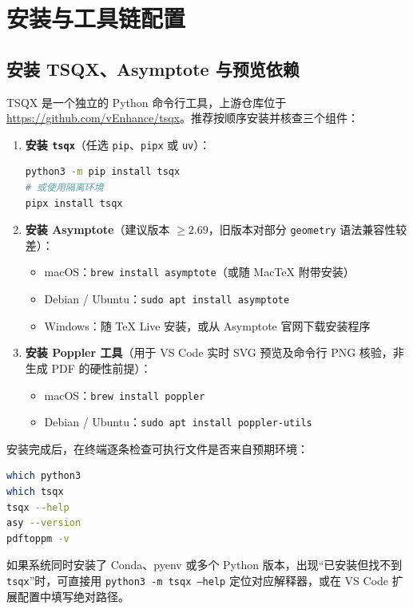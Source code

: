 \documentclass[11pt,oneside,fontset=none]{ctexbook}
\newcommand{\code}[1]{\texttt{#1}}
\begin{document}
\chapter{安装与工具链配置}

\section{安装 TSQX、Asymptote 与预览依赖}

TSQX 是一个独立的 Python 命令行工具，上游仓库位于 \url{https://github.com/vEnhance/tsqx}。推荐按顺序安装并核查三个组件：

\begin{enumerate}
  \item \textbf{安装 \code{tsqx}}（任选 \code{pip}、\code{pipx} 或 \code{uv}）：
\begin{lstlisting}[language=bash]
python3 -m pip install tsqx
# 或使用隔离环境
pipx install tsqx
\end{lstlisting}
  \item \textbf{安装 Asymptote}（建议版本 \(\ge 2.69\)，旧版本对部分 \code{geometry} 语法兼容性较差）：
  \begin{itemize}
    \item macOS：\code{brew install asymptote}（或随 MacTeX 附带安装）
    \item Debian / Ubuntu：\code{sudo apt install asymptote}
    \item Windows：随 TeX Live 安装，或从 Asymptote 官网下载安装程序
  \end{itemize}
  \item \textbf{安装 Poppler 工具}（用于 VS Code 实时 SVG 预览及命令行 PNG 核验，非生成 PDF 的硬性前提）：
  \begin{itemize}
    \item macOS：\code{brew install poppler}
    \item Debian / Ubuntu：\code{sudo apt install poppler-utils}
  \end{itemize}
\end{enumerate}

安装完成后，在终端逐条检查可执行文件是否来自预期环境：
\begin{lstlisting}[language=bash]
which python3
which tsqx
tsqx --help
asy --version
pdftoppm -v
\end{lstlisting}

如果系统同时安装了 Conda、pyenv 或多个 Python 版本，出现“已安装但找不到 \code{tsqx}”时，可直接用 \code{python3 -m tsqx --help} 定位对应解释器，或在 VS Code 扩展配置中填写绝对路径。
\end{document}
